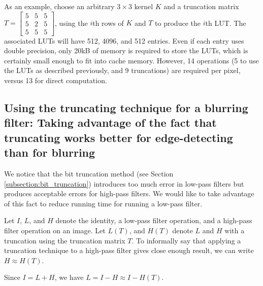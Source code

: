 \documentclass[12pt]{amsart}
\theoremstyle{definition}
\theoremstyle{remark}
\numberwithin{thm}{section}
\begin{document}
As an example, choose an arbitrary $3\times 3$ kernel $K$ and a truncation matrix $T = \left[\begin{smallmatrix}5 & 5 & 5\\5 & 2 & 5\\ 5 & 5 & 5\end{smallmatrix}\right]$, using the $i$th rows of $K$ and $T$ to produce the $i$th LUT. The associated LUTs will have 512, 4096, and 512 entries. Even if each entry uses double precision, only 20kB of memory is required to store the LUTs, which is certainly small enough to fit into cache memory. However, 14 operations (5 to use the LUTs as described previously, and 9 truncations) are required per pixel, versus 13 for direct computation. 

\subsection{Using the truncating technique for a blurring filter: Taking advantage of the fact that truncating works better for edge-detecting than for blurring}

We notice that the bit truncation method (see Section \ref{subsection:bit_truncation}) introduces too much error in low-pass filters but produces acceptable errors for high-pass filters. We would like to take advantage of this fact to reduce running time for running a low-pass filter.

Let $I$, $L$, and $H$ denote the identity, a low-pass filter operation, and a high-pass filter operation on an image.
Let $L(T)$, and $H(T)$ denote $L$ and $H$ with a truncation using the truncation matrix $T$.
To informally say that applying a truncation technique to a high-pass filter gives close enough result, we can write $H \approx H(T)$.

Since $I = L + H$, we have
$L = I - H \approx I - H(T)$.
\end{document}
